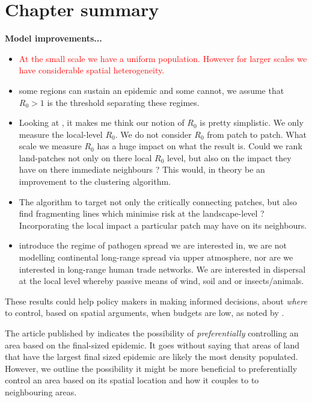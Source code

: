 \section{Chapter summary}

\textbf{Model improvements...}
\begin{itemize}
    \item \textcolor{red}{At the small scale we have a uniform population. However for larger scales we have considerable spatial heterogeneity.}
    \item some regions can sustain an epidemic and some cannot, we assume that $R_0>1$ is the threshold separating these regimes.
    \item Looking at \cite{R0-perc-ref}, it makes me think our notion of $R_0$ is pretty simplistic. We only measure the local-level $R_0$. We do not consider $R_0$ from patch to patch. What scale we measure $R_0$ has a huge impact on what the result is. Could we rank land-patches not only on there local $R_0$ level, but also on the impact they have on there immediate neighbours ? This would, in theory be an improvement to the clustering algorithm.
    \item The algorithm to target not only the critically connecting patches, but also find fragmenting lines which minimise risk at the landscape-level ? Incorporating the local impact a particular patch may have on its neighbours.
    \item introduce the regime of pathogen spread we are interested in, we are not modelling continental long-range spread via upper atmosphere, nor are we interested in long-range human trade networks. We are interested in dispersal at the local level whereby passive means of wind, soil and or insects/animals. 
\end{itemize}

These results could help policy makers in making informed decisions, about \textit{where} to control, based on spatial arguments, when budgets are low, as noted by \cite{time-varying-infectivity}.

The article published by \cite{time-varying-infectivity} indicates the possibility of \textit{preferentially} controlling an area based on the final-sized epidemic. It goes without saying that areas of land that have the largest final sized epidemic are likely the most density populated. However, we outline the possibility it might be more beneficial to preferentially control an area based on its spatial location and how it couples to to neighbouring areas.

